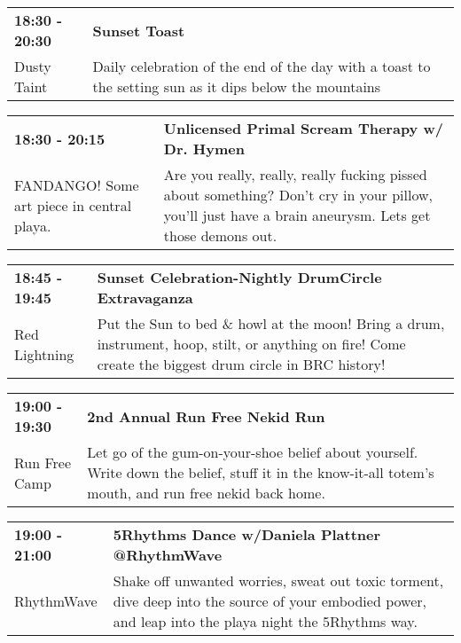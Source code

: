 \begin{tabular}{ p{1in} p{2.2in} }
    \textbf{18:30 - 20:30} & \textbf{Sunset Toast} \\
    Dusty Taint \newline  & Daily celebration of the end of the day with a toast to the setting sun as it dips below the mountains \\
    \hline 
\end{tabular}
    
\begin{tabular}{ p{1in} p{2.2in} }
    \textbf{18:30 - 20:15} & \textbf{Unlicensed Primal Scream Therapy w/ Dr. Hymen} \\
    FANDANGO! \newline Some art piece in central playa. & Are you really, really, really fucking pissed about something? Don't cry in your pillow, you'll just have a brain aneurysm. Lets get those demons out. \\
    \hline 
\end{tabular}
    
\begin{tabular}{ p{1in} p{2.2in} }
    \textbf{18:45 - 19:45} & \textbf{Sunset Celebration-Nightly DrumCircle Extravaganza} \\
    Red Lightning \newline  & Put the Sun to bed \& howl at the moon! Bring a drum, instrument, hoop, stilt, or anything on fire! Come create the biggest drum circle in BRC history! \\
    \hline 
\end{tabular}
    
\begin{tabular}{ p{1in} p{2.2in} }
    \textbf{19:00 - 19:30} & \textbf{2nd  Annual Run Free Nekid Run} \\
    Run Free Camp \newline  & Let go of the gum-on-your-shoe belief about yourself. Write down the belief, stuff it in the know-it-all totem's mouth, and run free nekid back home. \\
    \hline 
\end{tabular}
    
\begin{tabular}{ p{1in} p{2.2in} }
    \textbf{19:00 - 21:00} & \textbf{5Rhythms Dance w/Daniela Plattner @RhythmWave} \\
    RhythmWave \newline  & Shake off unwanted worries, sweat out toxic torment, dive deep into the source of your embodied power, and leap into the playa night the 5Rhythms way. \\
    \hline 
\end{tabular}
    
